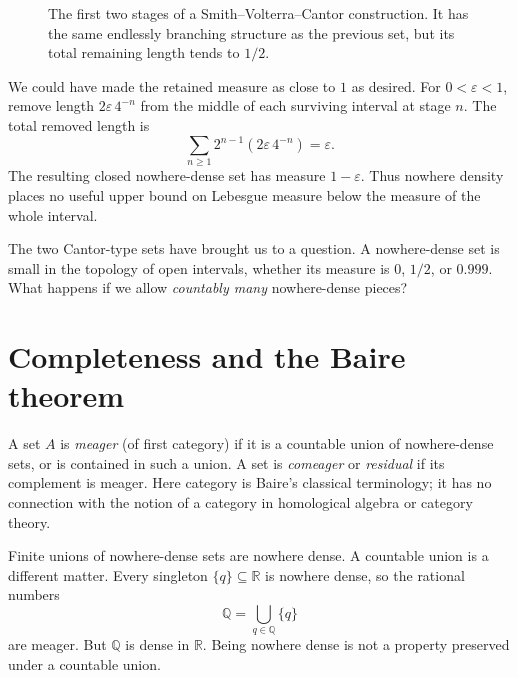 \begin{figure}[htbp]
\centering
{}
\caption{The first two stages of a Smith--Volterra--Cantor construction. It has the same endlessly branching structure as the previous set, but its total remaining length tends to \(1/2\).}
\label{fig:N20261020-fatcantor}
\end{figure}

We could have made the retained measure as close to \(1\) as desired. For \(0<\varepsilon<1\), remove length \(2\varepsilon\,4^{-n}\) from the middle of each surviving interval at stage \(n\). The total removed length is
\[
 \sum_{n\geq1}2^{n-1}(2\varepsilon\,4^{-n})=\varepsilon.
\]
The resulting closed nowhere-dense set has measure \(1-\varepsilon\). Thus nowhere density places no useful upper bound on Lebesgue measure below the measure of the whole interval.

The two Cantor-type sets have brought us to a question. A nowhere-dense set is small in the topology of open intervals, whether its measure is \(0\), \(1/2\), or \(0.999\). What happens if we allow \emph{countably many} nowhere-dense pieces?

\section{Completeness and the Baire theorem}

A set \(A\) is \emph{meager} (of first category) if it is a countable union of nowhere-dense sets, or is contained in such a union. A set is \emph{comeager} or \emph{residual} if its complement is meager. Here category is Baire's classical terminology; it has no connection with the notion of a category in homological algebra or category theory.

Finite unions of nowhere-dense sets are nowhere dense. A countable union is a different matter. Every singleton \(\{q\}\subseteq\mathbb R\) is nowhere dense, so the rational numbers
\[
 \mathbb Q=\bigcup_{q\in\mathbb Q}\{q\}
\]
are meager. But \(\mathbb Q\) is dense in \(\mathbb R\). Being nowhere dense is not a property preserved under a countable union.

